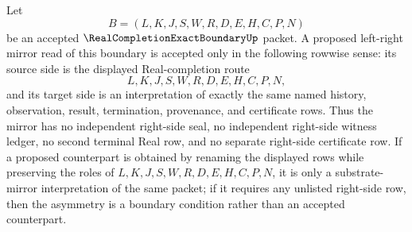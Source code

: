 \begin{theorem}
\label{thm:real-completion-exact-boundary-left-right-mirror-boundary}
Let
$$
B=(L,K,J,S,W,R,D,E,H,C,P,N)
$$
be an accepted $\RealCompletionExactBoundaryUp$ packet. A proposed left-right mirror read of this boundary is accepted only in the following rowwise sense: its source side is the displayed Real-completion route
$$
L,K,J,S,W,R,D,E,H,C,P,N,
$$
and its target side is an interpretation of exactly the same named history, observation, result, termination, provenance, and certificate rows. Thus the mirror has no independent right-side seal, no independent right-side witness ledger, no second terminal Real row, and no separate right-side certificate row. If a proposed counterpart is obtained by renaming the displayed rows while preserving the roles of $L,K,J,S,W,R,D,E,H,C,P,N$, it is only a substrate-mirror interpretation of the same packet; if it requires any unlisted right-side row, then the asymmetry is a boundary condition rather than an accepted counterpart.
\end{theorem}
